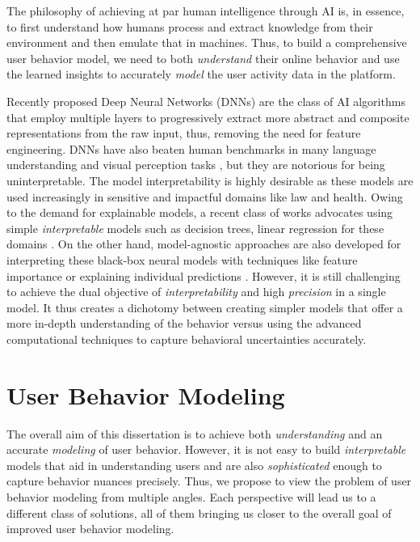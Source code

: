 The philosophy of achieving at par human intelligence through AI is, in essence, to first understand how humans process and extract knowledge from their environment and then emulate that in machines. Thus, to build a comprehensive user behavior model, we need to both \emph{understand} their online behavior and use the learned insights to accurately \emph{model} the user activity data in the platform.

Recently proposed Deep Neural Networks (DNNs) are the class of AI algorithms that employ multiple layers to progressively extract more abstract and composite representations from the raw input, thus, removing the need for feature engineering. DNNs have also beaten human benchmarks in many language understanding and visual perception tasks \cite{gilbert2013widespread, GoogleNet}, but they are notorious for being uninterpretable.
The model interpretability is highly desirable as these models are used increasingly in sensitive and impactful domains like law and health.
Owing to the demand for explainable models, a recent class of works advocates using simple \emph{interpretable} models such as decision trees, linear regression for these domains \cite{learning}. On the other hand, model-agnostic approaches are also developed for interpreting these black-box neural models with techniques like feature importance or explaining individual predictions \cite{lime, interpretable}.
However, it is still challenging to achieve the dual objective of \emph{interpretability} and high \emph{precision} in a single model.
It thus creates a dichotomy between creating simpler models that offer a more in-depth understanding of the behavior versus using the advanced computational techniques
to capture behavioral uncertainties accurately.


\section{User Behavior Modeling}
The overall aim of this dissertation is to achieve both \emph{understanding} and an accurate \emph{modeling} of user behavior.
However, it is not easy to build \emph{interpretable} models that aid in understanding users and are also \emph{sophisticated} enough to capture behavior nuances precisely.
Thus, we propose to view the problem of user behavior modeling from multiple angles. Each perspective will lead us to a different class of solutions, all of them bringing us closer to the overall goal of improved user behavior modeling.

